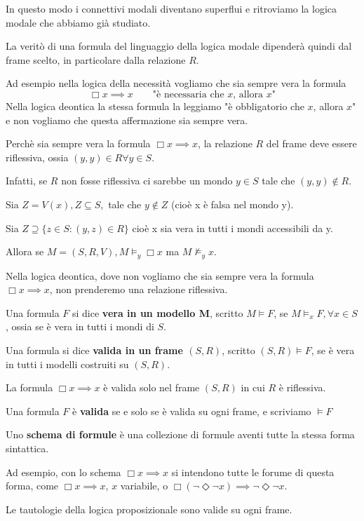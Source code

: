 \documentclass[../main.tex]{subfiles}
\begin{document}
In questo modo i connettivi modali diventano superflui e ritroviamo la logica modale che abbiamo già studiato.

La veritò di una formula del linguaggio della logica modale dipenderà quindi dal frame scelto, in particolare dalla relazione $R$.

Ad esempio nella logica della necessità vogliamo che sia sempre vera la formula
\begin{equation*}
    \Box x \implies x \qquad \text{"è necessaria che $x$, allora $x$"}
\end{equation*}
Nella logica deontica la stessa formula la leggiamo "è obbligatorio che $x$, allora $x$" e non vogliamo che questa affermazione sia sempre vera.

Perchè sia sempre vera la formula $\Box x \implies x$, la relazione $R$ del frame deve essere riflessiva, ossia $(y,y) \in R \forall y \in S$.

Infatti, se $R$ non fosse riflessiva ci sarebbe un mondo $y \in S$ tale che $(y,y) \notin R$.

Sia $Z = V(x), Z \subseteq S,$ tale che $y \notin Z$ (cioè x è falsa nel mondo y).

Sia $Z \supseteq \{z \in S : (y,z) \in R\}$ cioè x sia vera in tutti i mondi accessibili da y.

Allora se $M = (S, R, V), M \vDash_y \Box x$ ma $M \nvDash_y x$.

Nella logica deontica, dove non vogliamo che sia sempre vera la formula $\Box x \implies x$, non prenderemo una relazione riflessiva.
\begin{definition}
    Una formula $F$ si dice \textbf{vera in un modello M}, scritto \textbf{$M \vDash F$}, se $M \vDash_x F, \forall x \in S$, ossia se è vera in tutti i mondi di $S$.
\end{definition}
\begin{definition}
    Una formula si dice \textbf{valida in un frame $(S,R)$}, scritto $(S,R) \vDash F$, se è vera in tutti i modelli costruiti su $(S,R)$.
\end{definition}
\begin{example}
    La formula $\Box x \implies x$ è valida solo nel frame $(S,R)$ in cui $R$ è riflessiva.
\end{example}
\begin{definition}
    Una formula $F$ è \textbf{valida} se e solo se è valida su ogni frame, e scriviamo $\vDash F$
\end{definition}
\begin{definition}
    Uno \textbf{schema di formule} è una collezione di formule aventi tutte la stessa forma sintattica.

    Ad esempio, con lo schema $\Box x \implies x$ si intendono tutte le forume di questa forma, come $\Box x \implies x$, $x$ variabile, o $\Box (\neg \Diamond \neg x) \implies \neg \Diamond \neg x$.
\end{definition}
Le tautologie della logica proposizionale sono valide su ogni frame.
\end{document}
